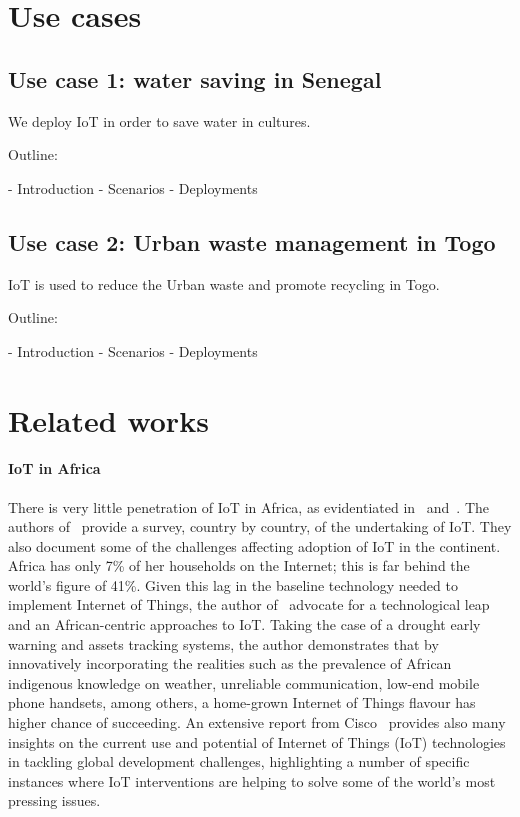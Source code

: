 \documentclass[10pt, conference, compsocconf]{IEEEtran}
\newcommand {\0} {\mathbf 0}
\newcommand {\1} {\mathbf 1}
\begin{document}
\section{Use cases}

\subsection{Use case 1: water saving in Senegal}
\label{usecase}

We deploy IoT in order to save water in cultures.
\begin{markdown}
Outline:

- Introduction
- Scenarios
- Deployments

\end{markdown}


\subsection{Use case 2: Urban waste management in Togo}
\label{usecase}

IoT is used to reduce the Urban waste and promote recycling in Togo.
\begin{markdown}
Outline:

- Introduction
- Scenarios
- Deployments

\end{markdown}


\section{Related works}
\label{sota}

\paragraph{IoT in Africa}
There is very little penetration of IoT in Africa, as evidentiated in~\cite{Onyalo2015} and~\cite{Masinde2014}.
The authors of~\cite{Onyalo2015} provide a survey, country by country, of the undertaking of IoT.
They also document some of the challenges affecting adoption of IoT in the continent.
Africa has only 7\% of her households on the Internet; this is far behind the world’s figure of 41\%.
Given this lag in the baseline technology needed to implement Internet of Things, the author of~\cite{Masinde2014} advocate for a technological leap and an African-centric approaches to IoT.
Taking the case of a drought early warning and assets tracking systems, the author demonstrates that by innovatively incorporating the realities such as the prevalence of African indigenous knowledge on weather, unreliable communication, low-end mobile phone handsets, among others, a home-grown Internet of Things flavour has higher chance of succeeding.
An extensive report from Cisco~\cite{ITU2015} provides also many insights on the current use and potential of Internet of Things (IoT) technologies in tackling global development challenges, highlighting a number of specific instances where IoT interventions are helping to solve some of the world’s most pressing issues.
\end{document}
